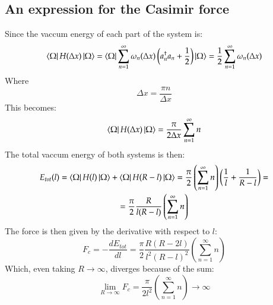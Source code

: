 \documentclass{article}
\begin{document}
\subsection{An expression for the Casimir force}
Since the vaccum energy of each part of the system is:
\begin{equation}
    \bra{\Omega}H(\Delta x)\ket{\Omega} = 
    \bra{\Omega}\sum_{n=1}^\infty \omega_n(\Delta x) \left(a^\dagger_n a_n + \frac{1}{2}\right)\ket{\Omega} = \frac{1}{2}\sum_{n=1}^\infty \omega_n(\Delta x)
\end{equation}
Where
\begin{equation}
    \Delta x = \frac{\pi n}{\Delta x}
\end{equation}
This becomes:
\begin{equation}
    \bra{\Omega}H(\Delta x)\ket{\Omega} = \frac{\pi}{2\Delta x}\sum_{n=1}^\infty n
\end{equation}
The total vaccum energy of both systems is then:
\begin{equation}
\begin{gathered}
    E_{tot}(l) = \bra{\Omega}H(l)\ket{\Omega} + \bra{\Omega}H(R - l)\ket{\Omega} = \frac{\pi}{2}\left(\sum_{n=1}^\infty n\right)\left(\frac{1}{l} + \frac{1}{R - l}\right) = \\ =
    \frac{\pi}{2}\frac{R}{l(R - l)}\left(\sum_{n=1}^\infty n\right)
\end{gathered}
\end{equation}
The force is then given by the derivative with respect to $l$:
\begin{equation}
    F_c = -\frac{dE_{tot}}{dl} = \frac{\pi}{2}\frac{R(R - 2l)}{l^2(R - l)^2}\left(\sum_{n=1}^\infty n\right)
\end{equation}
Which, even taking $R \rightarrow \infty$, diverges because of the sum:
\begin{equation}
    \lim_{R \rightarrow \infty} F_c = \frac{\pi}{2l^2}\left(\sum_{n=1}^\infty n\right) \rightarrow \infty
\end{equation}
\end{document}
